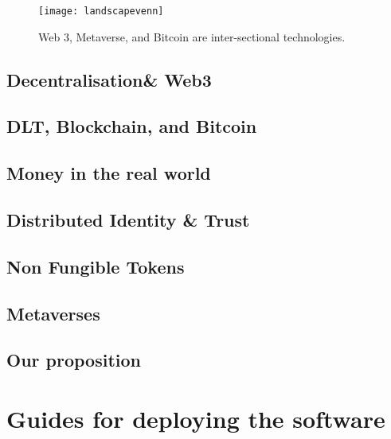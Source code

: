 \documentclass[
	12pt, %
	fleqn, %
	a4paper, %
	oneside, %
]{LegrandOrangeBook}
\begin{document}
\begin{figure*}[ht]\centering %
	\texttt{[image: landscapevenn]}
	\caption{Web 3, Metaverse, and Bitcoin are inter-sectional technologies.}
	\label{fig:landscapevenn}
\end{figure*}
\chapter{Decentralisation\& Web3}


\chapter{DLT, Blockchain, and Bitcoin}


\chapter{Money in the real world}


%

\chapter{Distributed Identity \& Trust}


\chapter{Non Fungible Tokens}


\chapter{Metaverses}


\chapter{Our proposition}


\part{Guides for deploying the software}


\stopcontents[part] %
\end{document}
